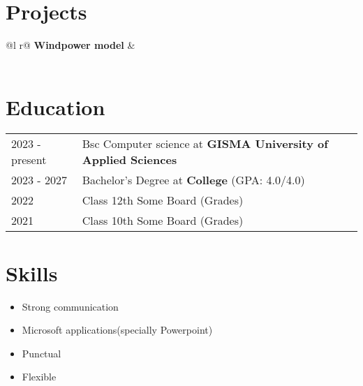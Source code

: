 \documentclass[a4paper,12pt]{article}
\begin{document}
\section{Projects}

\begin{tabularx}{\linewidth}{ @{}l r@{} }
\textbf{Windpower model} & \hfill \\[3.75pt]
  \\
\end{tabularx}

\section{Education}
\begin{tabularx}{\linewidth}{@{}l X@{}}	
2023 - present & Bsc Computer science at \textbf{GISMA University of Applied Sciences} \hfill \\

2023 - 2027 & Bachelor's Degree at \textbf{College} \hfill (GPA: 4.0/4.0) \\ 

2022 & Class 12th Some Board \hfill  (Grades) \\

2021 & Class 10th Some Board \hfill  (Grades) \\
\end{tabularx}

\section{Skills}
\begin{itemize}
    \item Strong communication
    \item Microsoft applications(specially Powerpoint)
    \item Punctual
    \item  Flexible
\end{itemize}
\end{document}
